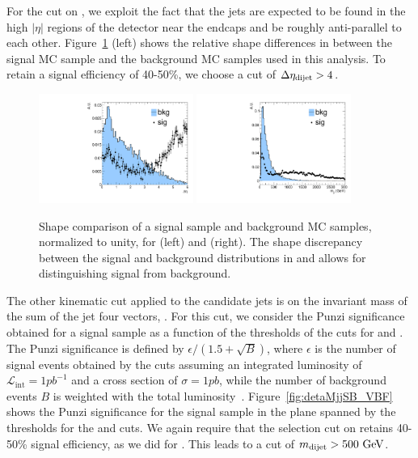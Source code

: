 For the cut on \DetaVBF, we exploit the fact that the \VBF jets are expected to be found in the high $|\eta|$ regions of the detector near the endcaps and be roughly anti-parallel to each other.
Figure~\ref{fig:detaSB_VBF} (left) shows the relative shape differences in \DetaVBF between the \VBF\RadtoWW signal MC sample and the background MC samples used in this analysis.
To retain a signal efficiency of 40-50\%, we choose a cut of $\DetaVBF>4$.

\begin{figure}[htbp]
  \centering
  \includegraphics[width=0.45\textwidth]{fig/analysis/detaSB.pdf}
  \includegraphics[width=0.45\textwidth]{fig/analysis/mjjSB.pdf}\\
  \caption{
    Shape comparison of a \VBF\RadtoWW signal sample and background MC samples, normalized to unity, for \DetaVBF (left) and \mjjVBF (right).
    The shape discrepancy between the \VBF signal and background distributions in \DetaVBF and \mjjVBF allows for distinguishing signal from background.
  }
  \label{fig:detaSB_VBF}
\end{figure}

The other kinematic cut applied to the \VBF candidate jets is on the invariant mass of the sum of the \VBF jet four vectors, \mjjVBF.
For this cut, we consider the Punzi significance obtained for a \VBF signal sample as a function of the thresholds of the cuts for \DetaVBF and \mjjVBF.
The Punzi significance is defined by $\epsilon/(1.5+\sqrt{B})$, where $\epsilon$ is the number of signal events obtained by the cuts assuming an integrated luminosity of $\mathcal{L}_\mathrm{int}=1\unit{pb^{-1}}$ and a cross section of $\sigma=1\unit{pb}$, while the number of background events $B$ is weighted with the total luminosity~\cite{Punzi:2003bu}.
Figure~\ref{fig:detaMjjSB_VBF} shows the Punzi significance for the \VBF\RadtoWW signal sample in the plane spanned by the thresholds for the \DetaVBF and \mjjVBF cuts.
We again require that the selection cut on \mjjVBF retains 40-50\% signal efficiency, as we did for \DetaVBF.
This leads to a cut of $\mjjVBF>500\unit{GeV}$.

